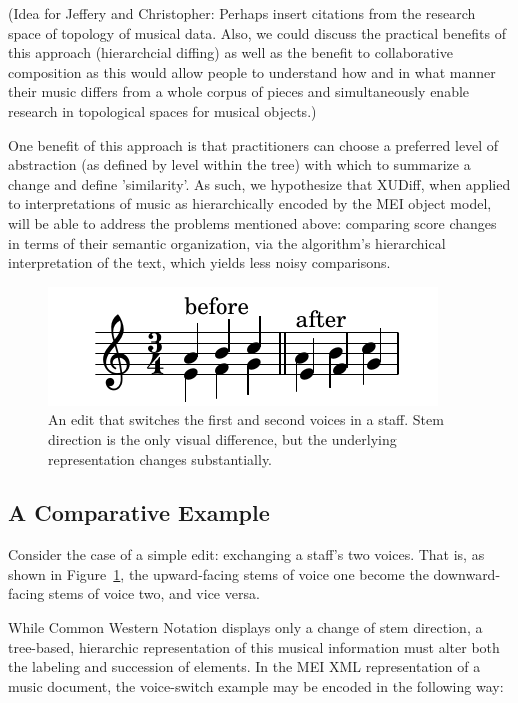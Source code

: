 \documentclass{article}
\begin{document}
(Idea for Jeffery and Christopher:  Perhaps insert citations from the research space of topology
of musical data.  Also, we could discuss the practical benefits of
this approach (hierarchcial diffing) as well as the benefit to
collaborative composition as this would allow people to understand how
and in what manner their music differs from a whole corpus of pieces
and simultaneously enable research in topological spaces for musical objects.)

One benefit of this approach is that practitioners can choose a
preferred level of abstraction (as defined by level within the tree)
with which to summarize a change and define 'similarity'.  As such, we
hypothesize that XUDiff, when applied to interpretations of music as
hierarchically encoded by the MEI object model, will be able to
address the problems mentioned above: comparing score changes in terms
of their semantic organization, via the algorithm's hierarchical
interpretation of the text, which yields less noisy comparisons.

\begin{figure}[!htb]
\centering
\includegraphics[width=0.7\columnwidth]{layers.pdf}
\caption{An edit that switches the first and second voices in a staff. Stem direction is the only visual difference, but the underlying representation changes substantially.}
\label{fig:voice_swap}
\end{figure}

\subsection{A Comparative Example}
Consider the case of a simple edit: exchanging a staff's two voices.
That is, as shown in Figure~\ref{fig:voice_swap}, the upward-facing
stems of voice one become the downward-facing stems of voice two, and
vice versa.

While Common Western Notation displays only a change of stem
direction, a tree-based, hierarchic representation of this musical
information must alter both the labeling and succession of elements.
In the MEI XML representation of a music document, the voice-switch
example may be encoded in the following way:
\end{document}
